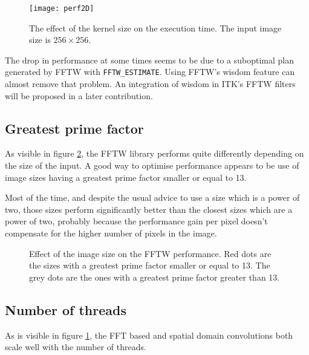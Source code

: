 \documentclass{InsightArticle}
\begin{document}
\begin{figure}[htbp]
\centering
\texttt{[image: perf2D]}
\caption{The effect of the kernel size on the execution time. The input image size is $256 \times 256$.
\label{fig:perf-kernel}}
\end{figure}

The drop in performance at some times seems to be due to a suboptimal plan generated by FFTW with \verb$FFTW_ESTIMATE$.
Using FFTW's wisdom feature can almost remove that problem. An integration of wisdom in ITK's FFTW
filters will be proposed in a later contribution.

\subsection{Greatest prime factor}
\label{perf:gpf}
As visible in figure \ref{fig:perf-fftw3}, the FFTW library performs quite differently depending on the
size of the input. A good way to optimise performance appears to be use of image sizes having a greatest
prime factor smaller or equal to 13.

Most of the time, and despite the usual advice to use a size which is a power of two,
those sizes perform significantly better than the closest sizes which are a power of two, probably
because the performance gain per pixel doesn't compensate for the higher number of pixels in the image.

\begin{figure}[htbp]
\begin{center}
\caption{Effect of the image size on the FFTW performance. Red dots are the sizes with a greatest prime
factor smaller or equal to 13. The grey dots are the ones with a greatest prime factor greater than 13.
\label{fig:perf-fftw3}}
\end{center}
\end{figure}

\subsection{Number of threads}

As is visible in figure \ref{fig:perf-kernel}, the FFT based and spatial domain convolutions both scale
well with the number of threads.
\end{document}
